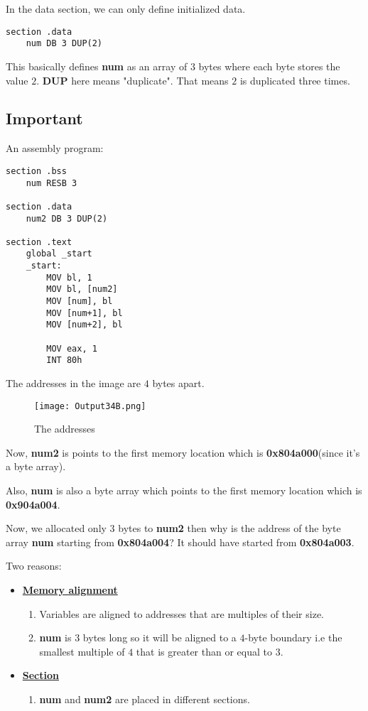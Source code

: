 \documentclass{article}
\makeatletter
\renewcommand\paragraph{\@startsection{paragraph}{4}{\z@}{-3.25ex \@plus -1ex \@minus -.2ex}{1.5ex \@plus .2ex}{\normalfont\normalsize\bfseries}}
\makeatother
\begin{document}
\paragraph{}
In the data section, we can only define initialized data.
\begin{Verbatim}[frame=single]
section .data
	num DB 3 DUP(2)
\end{Verbatim}
This basically defines \textbf{num} as an array of $3$ bytes where each byte stores the value $2$. \textbf{DUP} here means "duplicate". That means $2$ is duplicated three times.

\subsection{Important}\label{sec:imp}
\paragraph{}
An assembly program:
\begin{Verbatim}[frame=single]
section .bss
	num RESB 3

section .data
	num2 DB 3 DUP(2)

section .text
	global _start
	_start:
		MOV bl, 1
		MOV bl, [num2]
		MOV [num], bl
		MOV [num+1], bl
		MOV [num+2], bl
		
		MOV eax, 1
		INT 80h
\end{Verbatim}
The addresses in the image are $4$ bytes apart.
\begin{figure}[h]
\centering
\texttt{[image: Output34B.png]}
\caption{The addresses}
\label{fig:fig4}
\end{figure}
\newpage
Now, \textbf{num2} is points to the first memory location which is \textbf{0x804a000}(since it's a byte array).

Also, \textbf{num} is also a byte array which points to the first memory location which is \textbf{0x904a004}.

Now, we allocated only $3$ bytes to \textbf{num2} then why is the address of the byte array \textbf{num} starting from \textbf{0x804a004}? It should have started from \textbf{0x804a003}.

Two reasons:

\begin{itemize}
\item \underline{\textbf{Memory alignment}}
\begin{enumerate}[label=\textopenbullet]
\item Variables are aligned to addresses that are multiples of their size.
\item \textbf{num} is $3$ bytes long so it will be aligned to a $4$-byte boundary i.e the smallest multiple of $4$ that is greater than or equal to $3$.
\end{enumerate}
\item \underline{\textbf{Section}}
\begin{enumerate}[label=\textopenbullet]
\item \textbf{num} and \textbf{num2} are placed in different sections.
\end{enumerate}
\end{itemize}
\end{document}
